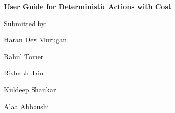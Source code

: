 \documentclass[12pt]{article}
\begin{document}
\vspace{\baselineskip}
\begin{Center}
{\fontsize{16pt}{19.2pt}\selectfont \textbf{\textcolor[HTML]{1F4E79}{\uline{User Guide for Deterministic Actions with Cost}}}\par}
\end{Center}\par


\vspace{\baselineskip}

\vspace{\baselineskip}

\vspace{\baselineskip}
{\fontsize{14pt}{16.8pt}\selectfont Submitted by: \tab \par}\par

\begin{adjustwidth}{0.5in}{0.0in}
{\fontsize{14pt}{16.8pt}\selectfont Haran Dev Murugan\par}\par

\end{adjustwidth}

\begin{adjustwidth}{0.5in}{0.0in}
{\fontsize{14pt}{16.8pt}\selectfont Rahul Tomer\par}\par

\end{adjustwidth}

\begin{adjustwidth}{0.5in}{0.0in}
{\fontsize{14pt}{16.8pt}\selectfont Rishabh Jain\par}\par

\end{adjustwidth}

\begin{adjustwidth}{0.5in}{0.0in}
{\fontsize{14pt}{16.8pt}\selectfont Kuldeep Shankar\par}\par

\end{adjustwidth}

\begin{adjustwidth}{0.5in}{0.0in}
{\fontsize{14pt}{16.8pt}\selectfont Alaa Abboushi\par}\par

\end{adjustwidth}
\end{document}
